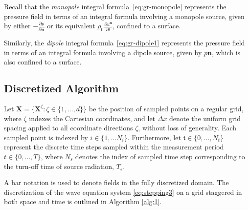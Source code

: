 \documentclass[11pt,reqno]{amsart}
\theoremstyle{remark}
\theoremstyle{italic_lemma}
\newcommand{\bt}{\mathfrak{t}}
\newcommand{\bX}{\boldsymbol{X}}
\newcommand{\bn}{\boldsymbol{n}}
\begin{document}
Recall that the \emph{monopole} integral formula~\eqref{eq:gr-monopole} represents the pressure field in terms of an integral formula involving a monopole source, given by either \( -\frac{\partial p}{\partial \bn} \) or its equivalent \( \rho_0 \frac{\partial u^{\bn}}{\partial t} \), confined to a surface.

Similarly, the \emph{dipole} integral formula~\eqref{eq:gr-dipole1} represents the pressure field in terms of an integral formula involving a dipole source, given by  \( p \bn \), which is also confined to a surface.

\subsection{Discretized Algorithm}  
\label{sec:discretised}

Let \( \bX = \{\bX^\zeta : \zeta \in \{1, \ldots, d\} \} \) be the position of sampled points on a regular grid, where \( \zeta \) indexes the Cartesian coordinates, and let \( \Delta x \) denote the uniform grid spacing applied to all coordinate directions \( \zeta \), without loss of generality. Each sampled point is indexed by \( i \in \{ 1,\ldots N_i \} \). Furthermore, let \( \bt \in \{0, \ldots, N_t\} \) represent the discrete time steps sampled within the measurement period \( t \in \{0, \ldots, T\} \), where \( N_s \) denotes the index of sampled time step corresponding to the turn-off time of source radiation, \( T_s \).


A bar notation is used to denote fields in the fully discretized domain. The discretization of the wave equation system \eqref{eq:stepping3} on a grid staggered in both space and time is outlined in Algorithm \ref{alg:1}.
\end{document}
